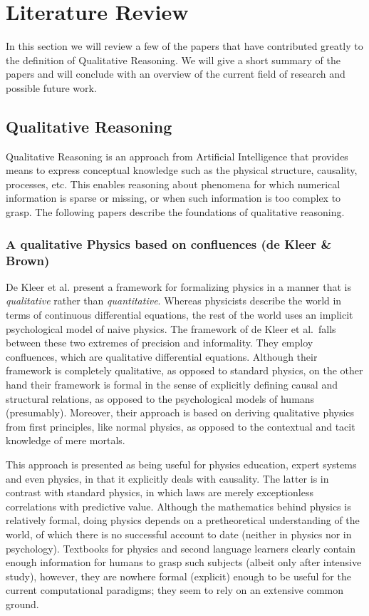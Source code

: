 \documentclass{article} %
\begin{document}
\section{Literature Review}
\label{sec:litrev}
In this section we will review a few of the papers that have contributed
greatly to the definition of Qualitative Reasoning. We will give a short
summary of the papers and will conclude with an overview of the current field
of research and possible future work. 

\subsection{Qualitative Reasoning}
\label{sec:litrev_qr}
Qualitative Reasoning is an approach from Artificial Intelligence that provides
means to express conceptual knowledge such as the physical structure,
causality, processes, etc.  This enables reasoning about phenomena for which
numerical information is sparse or missing, or when such information is too
complex to grasp.  The following papers describe the foundations of qualitative
reasoning.

\subsubsection{A qualitative Physics based on confluences (de Kleer \& Brown)}
\label{sec:litrev_qr_dekleer}
De Kleer et al. \cite{kleer} present a framework for formalizing physics in a
manner that is {\em qualitative} rather than {\em quantitative}. Whereas
physicists describe the world in terms of continuous differential equations,
the rest of the world uses an implicit psychological model of naive physics.
The framework of de Kleer et al.\ falls between these two extremes of precision
and informality. They employ confluences, which are qualitative differential
equations.  Although their framework is completely qualitative, as opposed to
standard physics, on the other hand their framework is formal in the sense of
explicitly defining causal and structural relations, as opposed to the
psychological models of humans (presumably). Moreover, their approach is based
on deriving qualitative physics from first principles, like normal physics, as
opposed to the contextual and tacit knowledge of mere mortals.

This approach is presented as being useful for physics education, expert
systems and even physics, in that it explicitly deals with causality. The
latter is in contrast with standard physics, in which laws are merely
exceptionless correlations with predictive value. Although the mathematics
behind physics is relatively formal, doing physics depends on a pretheoretical
understanding of the world, of which there is no successful account to date
(neither in physics nor in psychology). Textbooks for physics and second
language learners clearly contain enough information for humans to grasp
such subjects (albeit only after intensive study), however, they are nowhere
formal (explicit) enough to be useful for the current computational paradigms;
they seem to rely on an extensive common ground.
\end{document}
